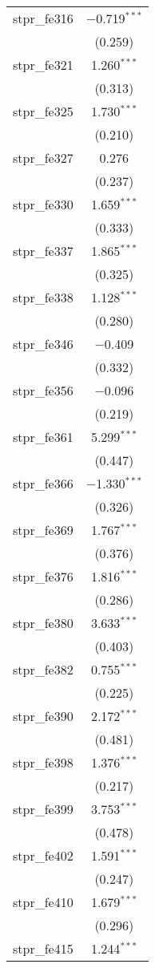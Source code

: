 \begin{table}[!htbp]
\begin{tabular}{@{\extracolsep{5pt}}lc}
  stpr\_fe316 & $-$0.719$^{***}$ \\ 
  & (0.259) \\ 
  stpr\_fe321 & 1.260$^{***}$ \\ 
  & (0.313) \\ 
  stpr\_fe325 & 1.730$^{***}$ \\ 
  & (0.210) \\ 
  stpr\_fe327 & 0.276 \\ 
  & (0.237) \\ 
  stpr\_fe330 & 1.659$^{***}$ \\ 
  & (0.333) \\ 
  stpr\_fe337 & 1.865$^{***}$ \\ 
  & (0.325) \\ 
  stpr\_fe338 & 1.128$^{***}$ \\ 
  & (0.280) \\ 
  stpr\_fe346 & $-$0.409 \\ 
  & (0.332) \\ 
  stpr\_fe356 & $-$0.096 \\ 
  & (0.219) \\ 
  stpr\_fe361 & 5.299$^{***}$ \\ 
  & (0.447) \\ 
  stpr\_fe366 & $-$1.330$^{***}$ \\ 
  & (0.326) \\ 
  stpr\_fe369 & 1.767$^{***}$ \\ 
  & (0.376) \\ 
  stpr\_fe376 & 1.816$^{***}$ \\ 
  & (0.286) \\ 
  stpr\_fe380 & 3.633$^{***}$ \\ 
  & (0.403) \\ 
  stpr\_fe382 & 0.755$^{***}$ \\ 
  & (0.225) \\ 
  stpr\_fe390 & 2.172$^{***}$ \\ 
  & (0.481) \\ 
  stpr\_fe398 & 1.376$^{***}$ \\ 
  & (0.217) \\ 
  stpr\_fe399 & 3.753$^{***}$ \\ 
  & (0.478) \\ 
  stpr\_fe402 & 1.591$^{***}$ \\ 
  & (0.247) \\ 
  stpr\_fe410 & 1.679$^{***}$ \\ 
  & (0.296) \\ 
  stpr\_fe415 & 1.244$^{***}$ \\ 

\end{tabular}
\end{table}
